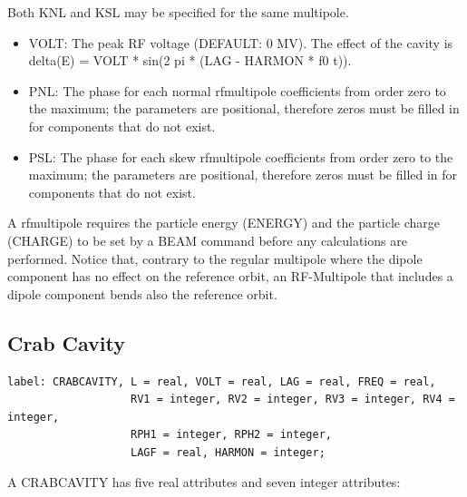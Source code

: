 Both KNL and KSL may be specified for the same multipole.  


\begin{itemize}
   \item VOLT: The peak RF voltage (DEFAULT: 0 MV). The effect of the
     cavity is \\ 
     delta(E) = VOLT * sin(2 pi * (LAG - HARMON * f0 t)). 
   \item PNL: The phase for each normal rfmultipole coefficients from
     order zero to the maximum; the parameters are positional,
     therefore zeros must be filled in for components that do not
     exist.  
   \item PSL: The phase for each skew rfmultipole coefficients from
     order zero to the maximum; the parameters are positional,
     therefore zeros must be filled in for components that do not
     exist.  
\end{itemize}       

A rfmultipole requires the particle energy (ENERGY) and the
particle charge (CHARGE) to be set by a BEAM command before any
calculations are performed. Notice that, contrary to the regular
multipole where the dipole component has no effect on the
reference orbit, an RF-Multipole that includes a dipole component
bends also the reference orbit.      



%
\subsection{Crab Cavity}
\label{sec:crab_cavity}

\begin{verbatim}
label: CRABCAVITY, L = real, VOLT = real, LAG = real, FREQ = real,
                   RV1 = integer, RV2 = integer, RV3 = integer, RV4 = integer, 
                   RPH1 = integer, RPH2 = integer, 
                   LAGF = real, HARMON = integer;                 
\end{verbatim} 


A CRABCAVITY has five real attributes and seven integer attributes: 

